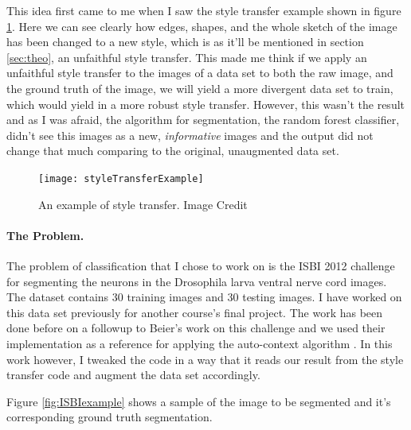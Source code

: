 \documentclass[12pt, a4paper]{scrartcl}
\begin{document}
This idea first came to me when I saw the style transfer example shown in figure \ref{fig:styleTransferExample}. Here we can see clearly how edges, shapes, and the whole sketch of the image has been changed to a new style, which is as it'll be mentioned in section \ref{sec:theo}, an unfaithful style transfer. This made me think if we apply an unfaithful style transfer to the images of a data set to both the raw image, and the ground truth of the image, we will yield a more divergent data set to train, which would yield in a more robust style transfer. However, this wasn't the result and as I was afraid, the algorithm for segmentation, the random forest classifier, didn't see this images as a new, \emph{informative} images and the output did not change that much comparing to the original, unaugmented data set.

\begin{figure}[h]
	\centering
	\texttt{[image: styleTransferExample]}
	\caption{An example of style transfer. Image Credit \cite{engstrom2016faststyletransfer}}
	\label{fig:styleTransferExample}
\end{figure}


\paragraph{The Problem.} 

The problem of classification that I chose to work on is the ISBI 2012 challenge\cite{isbi} for segmenting the neurons in the Drosophila larva ventral nerve cord images. The dataset contains 30 training images and 30 testing images. I have worked on this data set previously for another course's final project. The work has been done before on a followup to Beier's \cite{6078} work on this challenge and we used their implementation as a reference for applying the auto-context algorithm \cite{MLCV2017}. In this work however, I tweaked the code in a way that it reads our result from the style transfer code and augment the data set accordingly. 

Figure \ref{fig:ISBIexample} shows a sample of the image to be segmented and it's corresponding ground truth segmentation.
\end{document}
